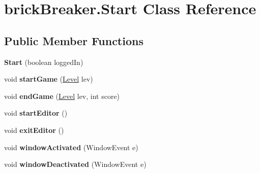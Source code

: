 \hypertarget{classbrick_breaker_1_1_start}{
\section{brickBreaker.Start Class Reference}
\label{classbrick_breaker_1_1_start}
}
\subsection*{Public Member Functions}
\begin{DoxyCompactItemize}
\item 
\hypertarget{classbrick_breaker_1_1_start_add9cb12f31b41a4c48a9631e3b813bfc}{
{\bfseries Start} (boolean loggedIn)}
\label{classbrick_breaker_1_1_start_add9cb12f31b41a4c48a9631e3b813bfc}

\item 
\hypertarget{classbrick_breaker_1_1_start_afe4437abe9e58312599f173ef8cc3033}{
void {\bfseries startGame} (\hyperlink{classbrick_breaker_1_1_level}{Level} lev)}
\label{classbrick_breaker_1_1_start_afe4437abe9e58312599f173ef8cc3033}

\item 
\hypertarget{classbrick_breaker_1_1_start_a794a63dad7a962820d9dd5bf26bf2e35}{
void {\bfseries endGame} (\hyperlink{classbrick_breaker_1_1_level}{Level} lev, int score)}
\label{classbrick_breaker_1_1_start_a794a63dad7a962820d9dd5bf26bf2e35}

\item 
\hypertarget{classbrick_breaker_1_1_start_a398e72365f82fe4214ea3534bfa34270}{
void {\bfseries startEditor} ()}
\label{classbrick_breaker_1_1_start_a398e72365f82fe4214ea3534bfa34270}

\item 
\hypertarget{classbrick_breaker_1_1_start_af99a0afe969ad087b6315a19e8b2289c}{
void {\bfseries exitEditor} ()}
\label{classbrick_breaker_1_1_start_af99a0afe969ad087b6315a19e8b2289c}

\item 
\hypertarget{classbrick_breaker_1_1_start_a8a00f5a3b3b443b9d54ea98808ffab37}{
void {\bfseries windowActivated} (WindowEvent e)}
\label{classbrick_breaker_1_1_start_a8a00f5a3b3b443b9d54ea98808ffab37}

\item 
\hypertarget{classbrick_breaker_1_1_start_ac2c1907f281e5cc6abf558789c8946b3}{
void {\bfseries windowDeactivated} (WindowEvent e)}
\label{classbrick_breaker_1_1_start_ac2c1907f281e5cc6abf558789c8946b3}


\end{DoxyCompactItemize}
